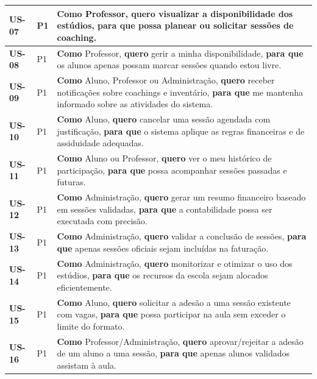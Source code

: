 \documentclass[12pt,a4paper]{report}
\begin{document}
\begin{longtable}{@{}p{} | p{} | p{}@{}}
\textbf{US-07} & P1 & \textbf{Como} Professor, \textbf{quero} visualizar a disponibilidade dos estúdios, \textbf{para que} possa planear ou solicitar sessões de coaching. \\ \midrule

\textbf{US-08} & P1 & \textbf{Como} Professor, \textbf{quero} gerir a minha disponibilidade, \textbf{para que} os alunos apenas possam marcar sessões quando estou livre. \\ \midrule

\textbf{US-09} & P1 & \textbf{Como} Aluno, Professor ou Administração, \textbf{quero} receber notificações sobre coachings e inventário, \textbf{para que} me mantenha informado sobre as atividades do sistema. \\ \midrule

\textbf{US-10} & P1 & \textbf{Como} Aluno, \textbf{quero} cancelar uma sessão agendada com justificação, \textbf{para que} o sistema aplique as regras financeiras e de assiduidade adequadas. \\ \midrule

\textbf{US-11} & P1 & \textbf{Como} Aluno ou Professor, \textbf{quero} ver o meu histórico de participação, \textbf{para que} possa acompanhar sessões passadas e futuras. \\ \midrule

\textbf{US-12} & P1 & \textbf{Como} Administração, \textbf{quero} gerar um resumo financeiro baseado em sessões validadas, \textbf{para que} a contabilidade possa ser executada com precisão. \\ \midrule

\textbf{US-13} & P1 & \textbf{Como} Administração, \textbf{quero} validar a conclusão de sessões, \textbf{para que} apenas sessões oficiais sejam incluídas na faturação. \\ \midrule

\textbf{US-14} & P1 & \textbf{Como} Administração, \textbf{quero} monitorizar e otimizar o uso dos estúdios, \textbf{para que} os recursos da escola sejam alocados eficientemente. \\ \midrule

\textbf{US-15} & P1 & \textbf{Como} Aluno, \textbf{quero} solicitar a adesão a uma sessão existente com vagas, \textbf{para que} possa participar na aula sem exceder o limite do formato. \\ \midrule

\textbf{US-16} & P1 & \textbf{Como} Professor/Administração, \textbf{quero} aprovar/rejeitar a adesão de um aluno a uma sessão, \textbf{para que} apenas alunos validados assistam à aula. \\ \midrule


\end{longtable}
\end{document}
